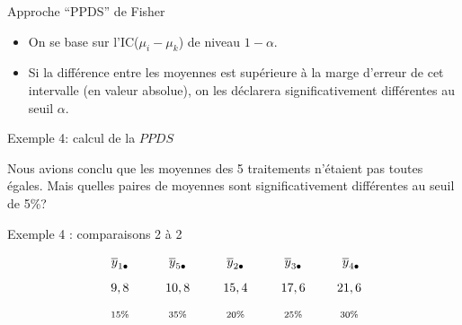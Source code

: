 \documentclass{BeamerTemplate}
\begin{document}
\begin{frame}[t]{Approche ``PPDS'' de Fisher}

\begin{itemize}
\item On se base sur l'IC($\mu_i-\mu_k$) de niveau $1-\alpha$.
\item Si la différence entre les moyennes est supérieure à la marge d'erreur de cet intervalle (en valeur absolue), on les déclarera significativement différentes au seuil $\alpha$.


\end{itemize}
\medskip
{}
\end{frame}

\begin{frame}[t]{Exemple 4: calcul de la $ PPDS$}

{\small
Nous avions conclu que les moyennes des 5 traitements n'étaient pas toutes égales. Mais quelles paires de moyennes sont significativement différentes au seuil de 5\%?}
\end{frame}

\begin{frame}[t]{Exemple 4 : comparaisons 2 à 2}

 $$
\begin{array}{c c c c c}
\;\;\;\;\overline y_{1\bullet} \;\;\;\;&\;\;\;\; \overline
y_{5\bullet} \;\;\;\;& \;\;\;\;\overline y_{2\bullet} \;\;\;\;
&\;\;\;\;\overline y_{3\bullet} \;\;\;\;&\;\;\;\;
\overline y_{4\bullet} \;\;\;\;\\[.3cm]
9,8 & 10,8 & 15,4 & 17,6 & 21,6\\[.3cm]
\textrm{\scriptsize 15\%}&
\textrm{\scriptsize 35\%}&
\textrm{\scriptsize 20\%}&
\textrm{\scriptsize 25\%}&
\textrm{\scriptsize 30\%}
\end{array}
$$
\end{frame}
\end{document}
